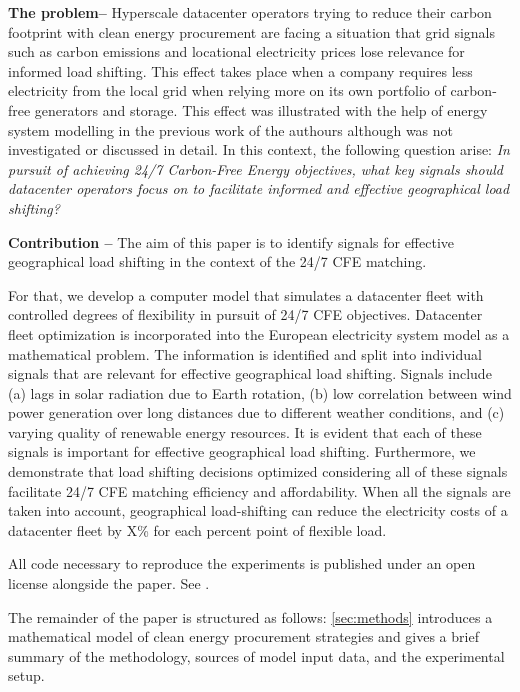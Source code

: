 \textbf{The problem--} Hyperscale datacenter operators trying to reduce their carbon footprint with clean energy procurement are facing a situation that grid signals such as carbon emissions and locational electricity prices lose relevance for informed load shifting. This effect takes place when a company requires less electricity from the local grid when relying more on its own portfolio of carbon-free generators and storage. This effect was illustrated with the help of energy system modelling in the previous work of the authours although was not investigated or discussed in detail. \cite{riepinValueSpacetimeLoadshifting2023} In this context, the following question arise: \textit{In pursuit of achieving 24/7 Carbon-Free Energy objectives, what key signals should datacenter operators focus on to facilitate informed and effective geographical load shifting? }

\textbf{Contribution --} The aim of this paper is to identify signals for effective geographical load shifting in the context of the 24/7 CFE matching. 

For that, we develop a computer model that simulates a datacenter fleet with controlled degrees of flexibility in pursuit of 24/7 CFE objectives. Datacenter fleet optimization is incorporated into the European electricity system model as a mathematical problem.
The information is identified and split into individual signals that are relevant for effective geographical load shifting. Signals include (a) lags in solar radiation due to Earth rotation, (b) low correlation between wind power generation over long distances due to different weather conditions, and (c) varying quality of renewable energy resources. It is evident that each of these signals is important for effective geographical load shifting. Furthermore, we demonstrate that load shifting decisions optimized considering all of these signals facilitate 24/7 CFE matching efficiency and affordability. When all the signals are taken into account, geographical load-shifting can reduce the electricity costs of a datacenter fleet by X\% for each percent point of flexible load.

All code necessary to reproduce the experiments is published under an open license alongside the paper. See .


The remainder of the paper is structured as follows: \cref{sec:methods} introduces a mathematical model of clean energy procurement strategies and gives a brief summary of the methodology, sources of model input data, and the experimental setup.
